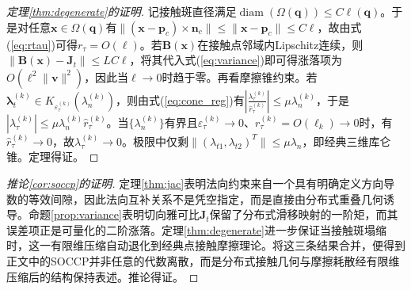 ﻿\documentclass[12pt, a4paper]{ctexart}
\theoremstyle{plain}
\theoremstyle{remark}
\begin{document}
\begin{proof}[定理\ref{thm:degenerate}的证明]
记接触斑直径满足$\operatorname{diam}(\Omega(\bm{q})) \le C \ell(\bm{q})$。于是对任意$\bm{x} \in \Omega(\bm{q})$有$ \| (\bm{x} - \bm{p}_c) \times \bm{n}_c \| \le \|\bm{x} - \bm{p}_c\| \le C\ell $，故由式(\ref{eq:rtau})可得$r_\tau = O(\ell)$。若$\bm{B}(\bm{x})$在接触点邻域内Lipschitz连续，则$ \| \bm{B}(\bm{x}) - \bm{J}_t \| \le LC\ell $，将其代入式(\ref{eq:variance})即可得涨落项为$O(\ell^2 \|\bm{v}\|^2)$，因此当$\ell \to 0$时趋于零。再看摩擦锥约束。若$\bm{\lambda}_t^{(k)} \in K_{\varepsilon_\tau^{(k)}}(\lambda_n^{(k)})$，则由式(\ref{eq:cone_reg})有$ \left| \frac{\lambda_\tau^{(k)}}{\hat{r}_\tau^{(k)}} \right| \le \mu \lambda_n^{(k)} $，于是$ |\lambda_\tau^{(k)}| \le \mu \lambda_n^{(k)} \hat{r}_\tau^{(k)} $。当$\{\lambda_n^{(k)}\}$有界且$\varepsilon_\tau^{(k)} \to 0$、$r_\tau^{(k)} = O(\ell_k) \to 0$时，有$\hat{r}_\tau^{(k)} \to 0$，故$\lambda_\tau^{(k)} \to 0$。极限中仅剩$ \| (\lambda_{t1},\lambda_{t2})^T \| \le \mu \lambda_n $，即经典三维库仑锥。定理得证。
\end{proof}

\begin{proof}[推论\ref{cor:soccp}的证明]
定理\ref{thm:jac}表明法向约束来自一个具有明确定义方向导数的等效间隙，因此法向互补关系不是凭空指定，而是直接由分布式重叠几何诱导。命题\ref{prop:variance}表明切向雅可比$\bm{J}_t$保留了分布式滑移映射的一阶矩，而其误差项正是可量化的二阶涨落。定理\ref{thm:degenerate}进一步保证当接触斑塌缩时，这一有限维压缩自动退化到经典点接触摩擦理论。将这三条结果合并，便得到正文中的SOCCP并非任意的代数离散，而是分布式接触几何与摩擦耗散经有限维压缩后的结构保持表述。推论得证。
\end{proof}
\end{document}
